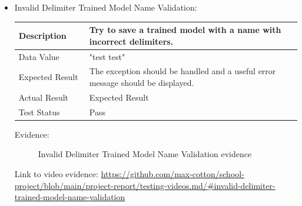 \documentclass[./project-report/src/latex/project-report.tex]{subfiles}
\begin{document}
\begin{itemize}
	\pagebreak

	\item Invalid Delimiter Trained Model Name Validation: \newline\newline
		\begin{tabular}{|p{0.25\linewidth}|p{0.75\linewidth}|}
			\hline
			Description & Try to save a trained model with a name with incorrect delimiters. \\
			\hline
			Data Value & "test  test" \\
			\hline
			Expected Result & The exception should be handled and a useful error message should be displayed. \\
			\hline
			Actual Result & Expected Result \\
			\hline
			Test Status & Pass \\
			\hline
		\end{tabular}

		\vspace{5mm}

		Evidence:
		\begin{figure}[h!]
		\centering
		\caption{Invalid Delimiter Trained Model Name Validation evidence}
		\end{figure}

		\begin{sloppypar}
		Link to video evidence: \url{https://github.com/max-cotton/school-project/blob/main/project-report/testing-videos.md/#invalid-delimiter-trained-model-name-validation}
		\end{sloppypar}
\end{itemize}
\end{document}
